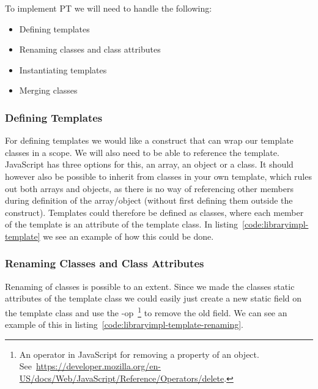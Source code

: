 To implement PT we will need to handle the following:

\begin{itemize}
    \item Defining templates
    \item Renaming classes and class attributes
    \item Instantiating templates
    \item Merging classes
\end{itemize}

\subsubsection{Defining Templates}\label{subsubsec:defining-templates}

For defining templates we would like a construct that can wrap our template classes in a scope.
We will also need to be able to reference the template.
JavaScript has three options for this, an array, an object or a class.
It should however also be possible to inherit from classes in your own template, which rules out both arrays and objects, as there is no way of referencing other members during definition of the array/object (without first defining them outside the construct).
Templates could therefore be defined as classes, where each member of the template is an attribute of the template class.
In listing~\vref{code:libraryimpl-template} we see an example of how this could be done.


\subsubsection{Renaming Classes and Class Attributes}\label{subsubsec:renaming-classes-and-class-attributes}

Renaming of classes is possible to an extent.
Since we made the classes static attributes of the template class we could easily just create a new static field on the template class and use the -op~\footnote{An operator in JavaScript for removing a property of an object. See~\url{https://developer.mozilla.org/en-US/docs/Web/JavaScript/Reference/Operators/delete}.} to remove the old field.
We can see an example of this in listing~\vref{code:libraryimpl-template-renaming}.




